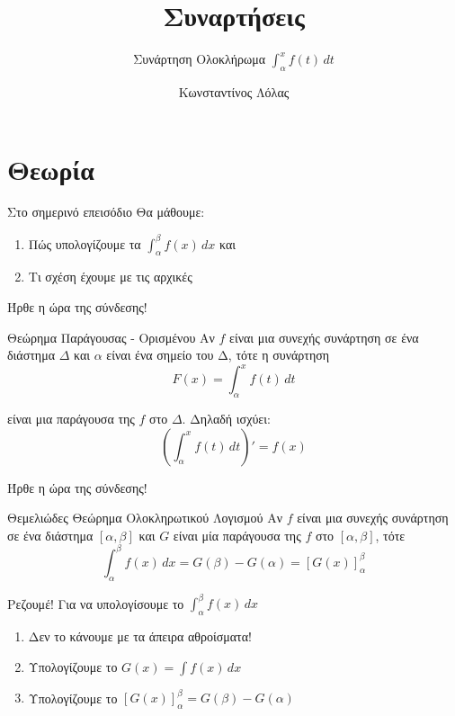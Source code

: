 \documentclass{presentation}
\title{Συναρτήσεις}
\subtitle{Συνάρτηση Ολοκλήρωμα $\int_α^x f(t)\, dt$}
\author[Λόλας]{Κωνσταντίνος Λόλας}
\begin{document}
\begin{frame}
  \titlepage
\end{frame}

\section{Θεωρία}

\begin{frame}{Στο σημερινό επεισόδιο}
  Θα μάθουμε:
  \begin{enumerate}
    \item Πώς υπολογίζουμε τα $\int_α^β f(x)\, dx$ και
    \item Τι σχέση έχουμε με τις αρχικές
  \end{enumerate}
\end{frame}

\begin{frame}{Ήρθε η ώρα της σύνδεσης!}
  \begin{block}{Θεώρημα Παράγουσας - Ορισμένου}
    Αν $f$ είναι μια συνεχής συνάρτηση σε ένα διάστημα $Δ$ και $α$ είναι ένα σημείο του Δ, τότε η συνάρτηση
    $$F(x)=\int_α^x f(t) \, dt$$

    είναι μια παράγουσα της $f$ στο $Δ$. Δηλαδή ισχύει:
    $$\left( \int_α^x f(t) \, dt \right)'=f(x)$$
  \end{block}
\end{frame}

\begin{frame}{Ήρθε η ώρα της σύνδεσης!}
  \begin{block}{Θεμελιώδες Θεώρημα Ολοκληρωτικού Λογισμού}
    Αν $f$ είναι μια συνεχής συνάρτηση σε ένα διάστημα $[α,β]$ και $G$ είναι μία παράγουσα της $f$ στο $[α,β]$, τότε
    $$\int_α^β f(x) \, dx=G(β)-G(α)=\left[ G(x) \right]_α^β $$
  \end{block}
\end{frame}

\begin{frame}{Ρεζουμέ!}
  Για να υπολογίσουμε το $\int_α^β f(x)\, dx$
  \begin{enumerate}[<+->]
    \item Δεν το κάνουμε με τα άπειρα αθροίσματα!
    \item Υπολογίζουμε το $G(x)=\int f(x)\, dx$
    \item Υπολογίζουμε το $\left[ G(x) \right]_α^β=G(β)-G(α) $
  \end{enumerate}
\end{frame}
\end{document}
